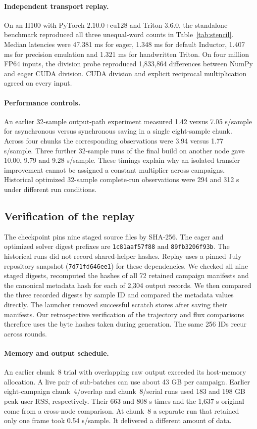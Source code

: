\documentclass{article}
\newcommand{\code}[1]{\texttt{#1}}
\begin{document}
\paragraph{Independent transport replay.}
On an H100 with PyTorch 2.10.0+cu128 and Triton 3.6.0, the standalone benchmark reproduced all three unequal-word counts in Table~\ref{tab:stencil}. Median latencies were 47.381 ms for eager, 1.348 ms for default Inductor, 1.407 ms for precision emulation and 1.321 ms for handwritten Triton. On four million FP64 inputs, the division probe reproduced 1,833,864 differences between NumPy and eager CUDA division. CUDA division and explicit reciprocal multiplication agreed on every input.

\paragraph{Performance controls.}
An earlier 32-sample output-path experiment measured 1.42 versus 7.05 s/sample for asynchronous versus synchronous saving in a single eight-sample chunk. Across four chunks the corresponding observations were 3.94 versus 1.77 s/sample. Three further 32-sample runs of the final build on another node gave 10.00, 9.79 and 9.28 s/sample. These timings explain why an isolated transfer improvement cannot be assigned a constant multiplier across campaigns. Historical optimized 32-sample complete-run observations were 294 and 312 s under different run conditions.

\subsection{Verification of the replay}
The checkpoint pins nine staged source files by SHA-256. The eager and optimized solver digest prefixes are \code{1c81aaf57f88} and \code{89fb3206f93b}. The historical runs did not record shared-helper hashes. Replay uses a pinned July repository snapshot (\code{7d71fd646ee1}) for these dependencies. We checked all nine staged digests, recomputed the hashes of all 72 retained campaign manifests and the canonical metadata hash for each of 2,304 output records. We then compared the three recorded digests by sample ID and compared the metadata values directly. The launcher removed successful scratch stores after saving their manifests. Our retrospective verification of the trajectory and flux comparisons therefore uses the byte hashes taken during generation. The same 256 IDs recur across rounds.

\paragraph{Memory and output schedule.}
An earlier chunk~8 trial with overlapping raw output exceeded its host-memory allocation. A live pair of sub-batches can use about 43 GB per campaign. Earlier eight-campaign chunk~4/overlap and chunk~8/serial runs used 183 and 198 GB peak user RSS, respectively. Their 663 and 808 s times and the 1,637 s original come from a cross-node comparison. At chunk~8 a separate run that retained only one frame took 0.54 s/sample. It delivered a different amount of data.
\end{document}
